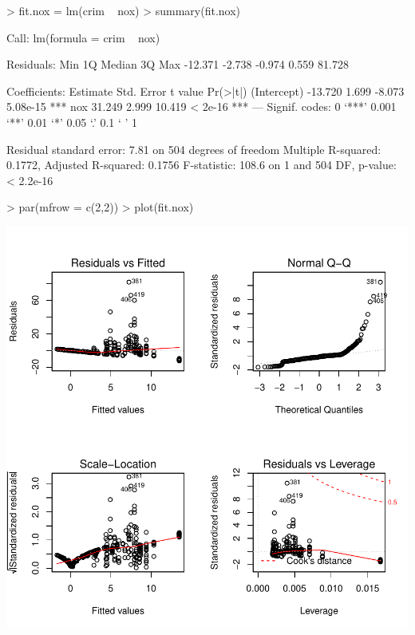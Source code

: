 \documentclass[a4paper]{article}
\begin{document}
\begin{Schunk}
\begin{Sinput}
> fit.nox = lm(crim ~ nox)
> summary(fit.nox)
\end{Sinput}
\begin{Soutput}
Call:
lm(formula = crim ~ nox)

Residuals:
    Min      1Q  Median      3Q     Max 
-12.371  -2.738  -0.974   0.559  81.728 

Coefficients:
            Estimate Std. Error t value Pr(>|t|)    
(Intercept)  -13.720      1.699  -8.073 5.08e-15 ***
nox           31.249      2.999  10.419  < 2e-16 ***
---
Signif. codes:  0 ‘***’ 0.001 ‘**’ 0.01 ‘*’ 0.05 ‘.’ 0.1 ‘ ’ 1

Residual standard error: 7.81 on 504 degrees of freedom
Multiple R-squared:  0.1772,	Adjusted R-squared:  0.1756 
F-statistic: 108.6 on 1 and 504 DF,  p-value: < 2.2e-16
\end{Soutput}
\begin{Sinput}
> par(mfrow = c(2,2))
> plot(fit.nox)
\end{Sinput}
\end{Schunk}
\includegraphics{mutivariblelm-nox}
\end{document}
